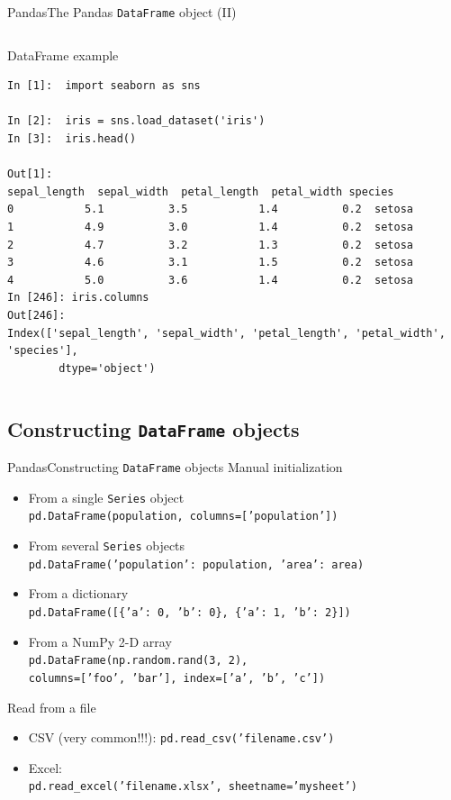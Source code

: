 \documentclass[10pt,compress]{beamer} %
\begin{document}
\begin{frame}[fragile]{Pandas}{The Pandas \texttt{DataFrame} object (II)}
	\begin{columns}
 	   \column{\textwidth}
		\begin{exampleblock}{\footnotesize{DataFrame example}}
		\vspace{-0.2cm} 
			\begin{lstlisting}
In [1]:  import seaborn as sns

In [2]:  iris = sns.load_dataset('iris')
In [3]:  iris.head()

Out[1]:
sepal_length  sepal_width  petal_length  petal_width species
0           5.1          3.5           1.4          0.2  setosa
1           4.9          3.0           1.4          0.2  setosa
2           4.7          3.2           1.3          0.2  setosa
3           4.6          3.1           1.5          0.2  setosa
4           5.0          3.6           1.4          0.2  setosa
In [246]: iris.columns
Out[246]: 
Index(['sepal_length', 'sepal_width', 'petal_length', 'petal_width', 'species'],
	    dtype='object')
		\end{lstlisting}
		\vspace{-0.2cm} 
		\end{exampleblock}
	\end{columns}
\end{frame}

\subsection{Constructing \texttt{DataFrame} objects}
\begin{frame}[fragile]{Pandas}{Constructing \texttt{DataFrame} objects}
	Manual initialization
	\begin{itemize}
		\item From a single \texttt{Series} object\\
		\texttt{pd.DataFrame(population, columns=['population'])}
		\item From several \texttt{Series} objects\\
		\texttt{pd.DataFrame({'population': population,
		                       'area': area})}
		\item From a dictionary\\
	    \texttt{pd.DataFrame([\{'a': 0, 'b': 0\}, \{'a': 1, 'b': 2\}])}
		\item From a NumPy 2-D array\\
		\texttt{pd.DataFrame(np.random.rand(3, 2), \\columns=['foo', 'bar'], index=['a', 'b', 'c'])}
	\end{itemize}
	Read from a file
	\begin{itemize}
		\item CSV (very common!!!): \texttt{pd.read\_csv('filename.csv')}
		\item Excel:\\
		\texttt{pd.read\_excel('filename.xlsx', sheetname='mysheet')}
	\end{itemize}
\end{frame}
\end{document}
